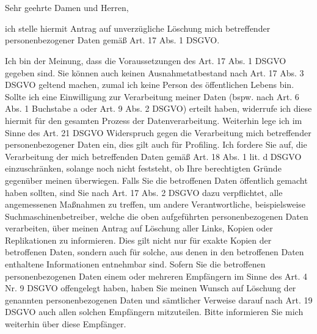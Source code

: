 \documentclass[a4paper, pagenumber=footmiddle, parskip=half,
	foldmarks=true,foldmarks=BmT, fromalign=right,
	fromphone=false, fromfax=false, fromemail=true, fromurl=false, fromlogo=false,
	fromrule=false, version=last]{scrlttr2}
\begin{document}
\begin{letter}{
	\EmpfaengerName\\
	\EmpfaengerStrasse\\
	\EmpfaengerStadt
}
\flushleft
\opening{Sehr geehrte Damen und Herren,}

ich stelle hiermit Antrag auf unverzügliche Löschung mich betreffender personenbezogener Daten gemäß Art. 17 Abs. 1 DSGVO.



Ich bin der Meinung, dass die Voraussetzungen des Art. 17 Abs. 1 DSGVO gegeben sind. Sie können auch keinen Ausnahmetatbestand nach Art. 17 Abs. 3 DSGVO geltend machen, zumal ich keine Person des öffentlichen Lebens bin.
\vspace*{5mm}
Sollte ich eine Einwilligung zur Verarbeitung meiner Daten (bspw. nach Art. 6 Abs. 1 Buchstabe a oder Art. 9 Abs. 2 DSGVO) erteilt haben, widerrufe ich diese hiermit für den gesamten Prozess der Datenverarbeitung.
Weiterhin lege ich im Sinne des Art. 21 DSGVO Widerspruch gegen die Verarbeitung mich betreffender personenbezogener Daten ein, dies gilt auch für Profiling. Ich fordere Sie auf, die Verarbeitung der mich betreffenden Daten gemäß Art. 18 Abs. 1 lit. d DSGVO einzuschränken, solange noch nicht feststeht, ob Ihre berechtigten Gründe gegenüber meinen überwiegen.
\vspace*{5mm}
Falls Sie die betroffenen Daten öffentlich gemacht haben sollten, sind Sie nach Art. 17 Abs. 2 DSGVO dazu verpflichtet, alle angemessenen Maßnahmen zu treffen, um andere Verantwortliche, beispielsweise Suchmaschinenbetreiber, welche die oben aufgeführten personenbezogenen Daten verarbeiten, über meinen Antrag auf Löschung aller Links, Kopien oder Replikationen zu informieren. Dies gilt nicht nur für exakte Kopien der betroffenen Daten, sondern auch für solche, aus denen in den betroffenen Daten enthaltene Informationen entnehmbar sind.
\vspace*{5mm}
Sofern Sie die betroffenen personenbezogenen Daten einem oder mehreren Empfängern im Sinne des Art. 4 Nr. 9 DSGVO offengelegt haben, haben Sie meinen Wunsch auf Löschung der genannten personenbezogenen Daten und sämtlicher Verweise darauf nach Art. 19 DSGVO auch allen solchen Empfängern mitzuteilen. Bitte informieren Sie mich weiterhin über diese Empfänger.


\end{letter}
\end{document}
